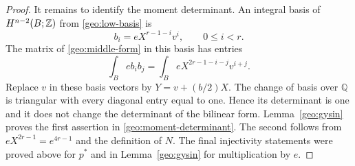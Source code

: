 \begin{proof}
It remains to identify the moment determinant.  An integral
basis of $H^{n-2}(B;\mathbb Z)$ from
\eqref{geo:low-basis} is
\[
 b_i=eX^{r-1-i}v^i,\qquad 0\le i<r.
\]
The matrix of \eqref{geo:middle-form} in this basis has entries
\[
 \int_Be b_i b_j
 =\int_B eX^{2r-1-i-j}v^{i+j}.
\]
Replace $v$ in these basis vectors by
$Y=v+(b/2)X$.  The change of basis over $\mathbb Q$ is triangular
with every diagonal entry equal to one.  Hence its determinant
is one and it does not change the determinant of the bilinear
form.  Lemma~\ref{geo:gysin} proves the first assertion in
\eqref{geo:moment-determinant}.  The second follows from
$eX^{2r-1}=e^{4r-1}$ and the definition of $N$.
The final injectivity statements were proved above for $p^*$
and in Lemma~\ref{geo:gysin} for multiplication by $e$.
\end{proof}
